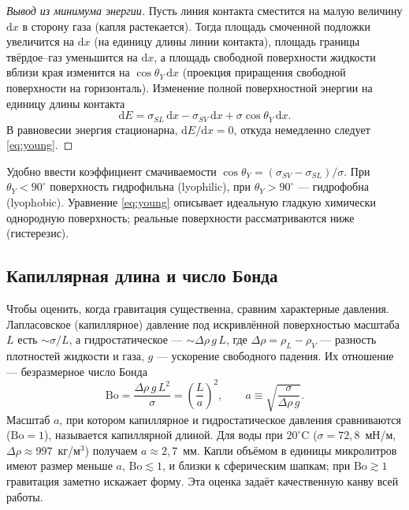 \documentclass[11pt]{article}
\newcommand{\Bo}{\mathrm{Bo}}
\newcommand{\rd}{\mathrm{d}}
\newcommand{\thY}{\theta_{Y}}
\theoremstyle{definition}
\begin{document}
\begin{proof}[Вывод из минимума энергии]
Пусть линия контакта сместится на малую величину $\rd x$ в сторону газа (капля
растекается). Тогда площадь смоченной подложки увеличится на $\rd x$ (на единицу
длины линии контакта), площадь границы твёрдое--газ уменьшится на $\rd x$, а
площадь свободной поверхности жидкости вблизи края изменится на $\cos\thY\,\rd x$
(проекция приращения свободной поверхности на горизонталь). Изменение полной
поверхностной энергии на единицу длины контакта
\begin{equation}
\rd E=\sigma_{SL}\,\rd x-\sigma_{SV}\,\rd x+\sigma\cos\thY\,\rd x .
\end{equation}
В равновесии энергия стационарна, $\rd E/\rd x=0$, откуда немедленно следует
\eqref{eq:young}. \end{proof}

Удобно ввести коэффициент смачиваемости $\cos\thY=(\sigma_{SV}-\sigma_{SL})/\sigma$.
При $\thY<90^{\circ}$ поверхность гидрофильна (lyophilic), при
$\thY>90^{\circ}$ --- гидрофобна (lyophobic). Уравнение \eqref{eq:young}
описывает идеальную гладкую химически однородную поверхность; реальные поверхности
рассматриваются ниже (гистерезис).

\subsection{Капиллярная длина и число Бонда}
Чтобы оценить, когда гравитация существенна, сравним характерные давления.
Лапласовское (капиллярное) давление под искривлённой поверхностью масштаба $L$
есть $\sim\sigma/L$, а гидростатическое --- $\sim\Delta\rho\, g\, L$, где
$\Delta\rho=\rho_{L}-\rho_{V}$ --- разность плотностей жидкости и газа, $g$ ---
ускорение свободного падения. Их отношение --- безразмерное число Бонда
\begin{equation}
\Bo=\frac{\Delta\rho\, g\, L^{2}}{\sigma}=\left(\frac{L}{a}\right)^{2},
\qquad
a\equiv\sqrt{\frac{\sigma}{\Delta\rho\, g}} .
\label{eq:bond}
\end{equation}
Масштаб $a$, при котором капиллярное и гидростатическое давления сравниваются
($\Bo=1$), называется капиллярной длиной. Для воды при $20^{\circ}$C
($\sigma=72{,}8$~мН/м, $\Delta\rho\approx 997$~кг/м$^3$) получаем
$a\approx 2{,}7$~мм. Капли объёмом в единицы микролитров имеют размер меньше $a$,
$\Bo\lesssim 1$, и близки к сферическим шапкам; при $\Bo\gtrsim 1$ гравитация
заметно искажает форму. Эта оценка задаёт качественную канву всей работы.
\end{document}
